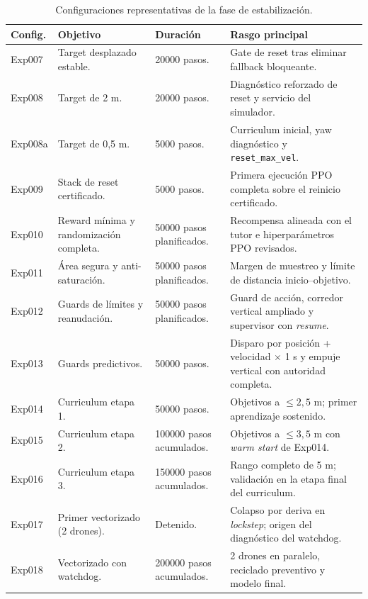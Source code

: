 \begin{table}[H]
\centering
\small
\setlength{\tabcolsep}{4pt}
\renewcommand{\arraystretch}{1.15}
\begin{tabular}{p{} p{} p{} p{}}
\hline
\textbf{Config.} & \textbf{Objetivo} & \textbf{Duración} & \textbf{Rasgo principal} \\
\hline
Exp007 & Target desplazado estable. & 20000 pasos. & Gate de reset tras eliminar fallback bloqueante. \\
Exp008 & Target de 2 m. & 20000 pasos. & Diagnóstico reforzado de reset y servicio del simulador. \\
Exp008a & Target de 0,5 m. & 5000 pasos. & Curriculum inicial, yaw diagnóstico y \texttt{reset\_max\_vel}. \\
Exp009 & Stack de reset certificado. & 5000 pasos. & Primera ejecución PPO completa sobre el reinicio certificado. \\
Exp010 & Reward mínima y randomización completa. & 50000 pasos planificados. & Recompensa alineada con el tutor e hiperparámetros PPO revisados. \\
Exp011 & Área segura y anti-saturación. & 50000 pasos planificados. & Margen de muestreo y límite de distancia inicio--objetivo. \\
Exp012 & Guards de límites y reanudación. & 50000 pasos planificados. & Guard de acción, corredor vertical ampliado y supervisor con \emph{resume}. \\
Exp013 & Guards predictivos. & 50000 pasos. & Disparo por posición + velocidad $\times$ 1 s y empuje vertical con autoridad completa. \\
Exp014 & Curriculum etapa 1. & 50000 pasos. & Objetivos a $\leq 2{,}5$ m; primer aprendizaje sostenido. \\
Exp015 & Curriculum etapa 2. & 100000 pasos acumulados. & Objetivos a $\leq 3{,}5$ m con \emph{warm start} de Exp014. \\
Exp016 & Curriculum etapa 3. & 150000 pasos acumulados. & Rango completo de 5 m; validación en la etapa final del curriculum. \\
Exp017 & Primer vectorizado (2 drones). & Detenido. & Colapso por deriva en \emph{lockstep}; origen del diagnóstico del watchdog. \\
Exp018 & Vectorizado con watchdog. & 200000 pasos acumulados. & 2 drones en paralelo, reciclado preventivo y modelo final. \\
\hline
\end{tabular}
\caption{Configuraciones representativas de la fase de estabilización.}
\label{tab:anexos:configs_representativas}
\end{table}


